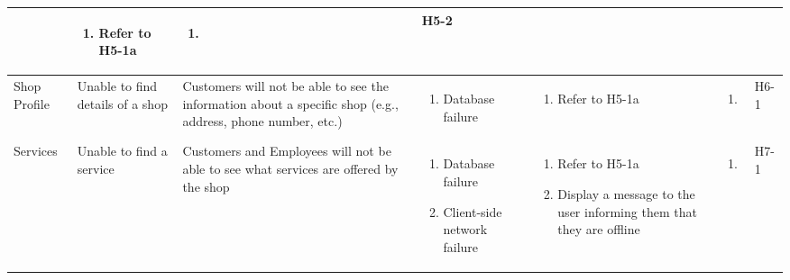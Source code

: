 \documentclass{article}
\begin{document}
\begin{landscape}
\begin{longtable}{|p{}|p{}|p{}|p{}|p{}|p{}|p{}|}
		 & \begin{enumerate}[label=\alph*., leftmargin=*]
			   \item Refer to H5-1a
		   \end{enumerate}
		 & \begin{enumerate}[label=\alph*., leftmargin=*]
			   \item
		   \end{enumerate}
		 & H5-2                                                                                                         \\
		\hline
		Shop Profile
		 & Unable to find details of a shop
		 & Customers will not be able to see the information about a specific shop (e.g., address, phone number, etc.)
		 & \begin{enumerate}[label=\alph*., leftmargin=*]
			   \item Database failure
		   \end{enumerate}
		 & \begin{enumerate}[label=\alph*., leftmargin=*]
			   \item Refer to H5-1a
		   \end{enumerate}
		 & \begin{enumerate}[label=\alph*., leftmargin=*]
			   \item
		   \end{enumerate}
		 & H6-1                                                                                                         \\
		\hline
		\multirow{2}{*}{Services}
		 & Unable to find a service
		 & Customers and Employees will not be able to see what services are offered by the shop
		 & \begin{enumerate}[label=\alph*., leftmargin=*]
			   \item Database failure
			   \item Client-side network failure
		   \end{enumerate}
		 & \begin{enumerate}[label=\alph*., leftmargin=*]
			   \item Refer to H5-1a
			   \item Display a message to the user informing them that they are offline
		   \end{enumerate}
		 & \begin{enumerate}[label=\alph*., leftmargin=*]
			   \item
		   \end{enumerate}
		 & H7-1                                                                                                         \\

\end{longtable}
\end{landscape}
\end{document}
